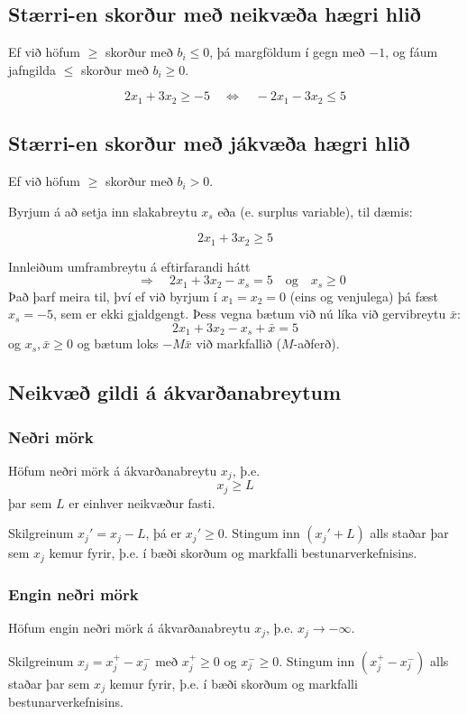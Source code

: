 \subsection{Stærri-en skorður með neikvæða hægri hlið}
Ef við höfum $\ge$ skorður  með  $b_i \le 0$, þá margföldum í gegn með $-1$, og fáum jafngilda $\le$ skorður með $b_i\ge0$. 

\begin{daemi}
$$2x_1+3x_2\ge -5 \quad \Leftrightarrow \quad -2x_1-3x_2\le 5$$ 
\end{daemi}

\subsection{Stærri-en skorður með jákvæða hægri hlið}
Ef við höfum $\ge$ skorður með  $b_i > 0$.

Byrjum á að setja inn slakabreytu $x_s$ eða  (e. surplus variable), til dæmis:

\begin{daemi}
$$2x_1 + 3x_2\ge 5 $$
\end{daemi}
\begin{lausn}Innleiðum umframbreytu á eftirfarandi hátt
$$\quad \Rightarrow \quad 2x_1 + 3x_2 - x_s =  5 \quad \textrm{og}\quad x_s\ge 0$$
Það þarf meira til, því ef við byrjum í $x_1=x_2=0$ (eins og venjulega) þá fæst $x_s=-5$, sem er ekki gjaldgengt. Þess vegna
bætum við nú líka við gervibreytu $\bar{x}$: 
$$2x_1 + 3x_2 - x_s + \bar{x} =  5$$ 
og  $x_s,\bar{x}\ge 0$ og bætum loks $-M\bar{x}$ við markfallið ($M$-aðferð). 
\end{lausn}

\subsection{Neikvæð gildi á ákvarðanabreytum}
\subsubsection{Neðri mörk}
Höfum neðri mörk á ákvarðanabreytu $x_j$, þ.e.
$$ x_j\geq L$$
þar sem $L$ er einhver neikvæður fasti.

\begin{lausn}
Skilgreinum $x_j'=x_j-L$, þá er $x_j'\geq0$. Stingum inn $(x_j'+L)$ alls staðar þar sem $x_j$ kemur fyrir, þ.e. í bæði skorðum og markfalli bestunarverkefnisins. 
\end{lausn}

\subsubsection{Engin neðri mörk}
Höfum engin neðri mörk á ákvarðanabreytu $x_j$, þ.e. $x_j\to-\infty$.
\begin{lausn}
Skilgreinum $x_j = x_j^+ - x_j^-$ með $x_j^+\geq0$ og $x_j^-\geq0$. Stingum inn $(x_j^+-x_j^-)$ alls staðar þar sem $x_j$ kemur fyrir, þ.e. í bæði skorðum og markfalli bestunarverkefnisins.
\end{lausn}

